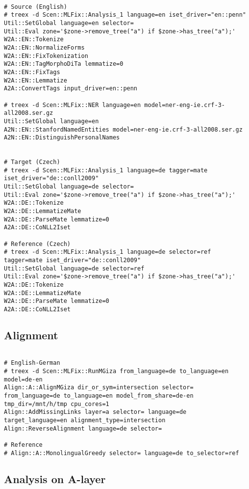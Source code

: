 \begin{lstlisting}

# Source (English)
# treex -d Scen::MLFix::Analysis_1 language=en iset_driver="en::penn"
Util::SetGlobal language=en selector=
Util::Eval zone='$zone->remove_tree("a") if $zone->has_tree("a");'
W2A::EN::Tokenize
W2A::EN::NormalizeForms
W2A::EN::FixTokenization
W2A::EN::TagMorphoDiTa lemmatize=0
W2A::EN::FixTags
W2A::EN::Lemmatize
A2A::ConvertTags input_driver=en::penn

# treex -d Scen::MLFix::NER language=en model=ner-eng-ie.crf-3-all2008.ser.gz
Util::SetGlobal language=en
A2N::EN::StanfordNamedEntities model=ner-eng-ie.crf-3-all2008.ser.gz
A2N::EN::DistinguishPersonalNames


# Target (Czech)
# treex -d Scen::MLFix::Analysis_1 language=de tagger=mate iset_driver="de::conll2009"
Util::SetGlobal language=de selector=
Util::Eval zone='$zone->remove_tree("a") if $zone->has_tree("a");'
W2A::DE::Tokenize
W2A::DE::LemmatizeMate
W2A::DE::ParseMate lemmatize=0
A2A::DE::CoNLL2Iset

# Reference (Czech)
# treex -d Scen::MLFix::Analysis_1 language=de selector=ref tagger=mate iset_driver="de::conll2009"
Util::SetGlobal language=de selector=ref
Util::Eval zone='$zone->remove_tree("a") if $zone->has_tree("a");'
W2A::DE::Tokenize
W2A::DE::LemmatizeMate
W2A::DE::ParseMate lemmatize=0
A2A::DE::CoNLL2Iset

\end{lstlisting}

\subsection{Alignment}

\begin{lstlisting}

# English-German
# treex -d Scen::MLFix::RunMGiza from_language=de to_language=en model=de-en
Align::A::AlignMGiza dir_or_sym=intersection selector= from_language=de to_language=en model_from_share=de-en tmp_dir=/mnt/h/tmp cpu_cores=1
Align::AddMissingLinks layer=a selector= language=de target_language=en alignment_type=intersection
Align::ReverseAlignment language=de selector=

# Reference
# Align::A::MonolingualGreedy selector= language=de to_selector=ref

\end{lstlisting}

\subsection{Analysis on A-layer}


